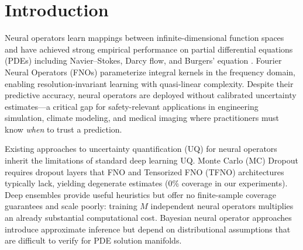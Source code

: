 
\begin{abstract}
Neural operators such as Fourier Neural Operators (FNOs) learn PDE solution maps
efficiently but lack calibrated uncertainty quantification with finite-sample
guarantees. We introduce \emph{spectral nonconformity scores} for conformal
prediction on neural operators, defined as weighted sums over Fourier error
coefficients: $s_w(u) = \sum_k w_k |\hat{u}_{\mathrm{err}}(k)|^2$. This
formulation unifies $L^2$ scores (uniform weights, via Parseval's identity),
Sobolev scores (polynomial weights $(1+|k|^2)^s$), and learned
frequency-dependent weights under a single framework with distribution-free
coverage guarantees. Across 57 configurations (3 architectures $\times$ 5 seeds,
plus ablations over $\alpha$ and calibration set size) on real Darcy flow data,
learned spectral weights produce 42\% tighter prediction bands
than uniform scores on FNO while maintaining valid coverage across all
configurations. Non-spectral architectures exhibit $3.8\times$ wider bands,
confirming that frequency-structured scores exploit the spectral bias inherent
in Fourier-based operators. Our results establish spectral conformal prediction
as a principled, architecture-aware approach to uncertainty quantification for
neural PDE solvers.
\end{abstract}

\section{Introduction}
\label{sec:introduction}

Neural operators learn mappings between infinite-dimensional function spaces and
have achieved strong empirical performance on partial differential equations
(PDEs) including Navier--Stokes, Darcy flow, and Burgers' equation
\citep{li2021fourier,lu2021learning,kovachki2023neural}. Fourier Neural
Operators (FNOs) parameterize integral kernels in the frequency domain, enabling
resolution-invariant learning with quasi-linear complexity. Despite their
predictive accuracy, neural operators are deployed without calibrated uncertainty
estimates---a critical gap for safety-relevant applications in engineering
simulation, climate modeling, and medical imaging where practitioners must know
\emph{when} to trust a prediction.

Existing approaches to uncertainty quantification (UQ) for neural operators
inherit the limitations of standard deep learning UQ. Monte Carlo (MC) Dropout
\citep{gal2016dropout} requires dropout layers that FNO and Tensorized FNO
(TFNO) architectures typically lack, yielding degenerate estimates (0\% coverage
in our experiments). Deep ensembles \citep{lakshminarayanan2017simple} provide
useful heuristics but offer no finite-sample coverage guarantees and scale
poorly: training $M$ independent neural operators multiplies an already
substantial computational cost. Bayesian neural operator approaches
\citep{magnani2022approximate} introduce approximate inference but depend on
distributional assumptions that are difficult to verify for PDE solution
manifolds.

